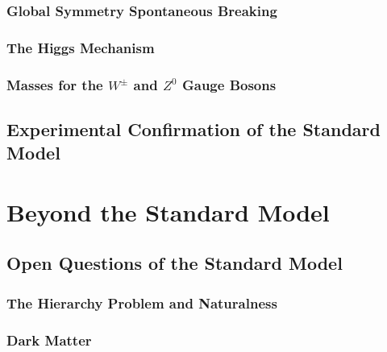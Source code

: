 \documentclass[10pt,twoside,cucitura,classica,english,openany]{toptesi}
\begin{document}


\subsection{Global Symmetry Spontaneous Breaking}
\label{sec:glob-symm-break}



\subsection{The Higgs Mechanism}
\label{sec:higgs-model}



\subsection{Masses for the $W^{\pm}$ and $Z^{0}$ Gauge Bosons}
\label{sec:masses-wpm-z}



\section{Experimental Confirmation of the Standard Model}
\label{sec:exper-conf-stand}



\chapter{Beyond the Standard Model}
\label{cha:beyond-stand-model}

\section{Open Questions of the Standard Model}
\label{sec:open-quest-stand}



\subsection{The Hierarchy Problem and Naturalness}
\label{sec:hier-probl-natur}



\subsection{Dark Matter}
\label{sec:dark-matter}
\end{document}
